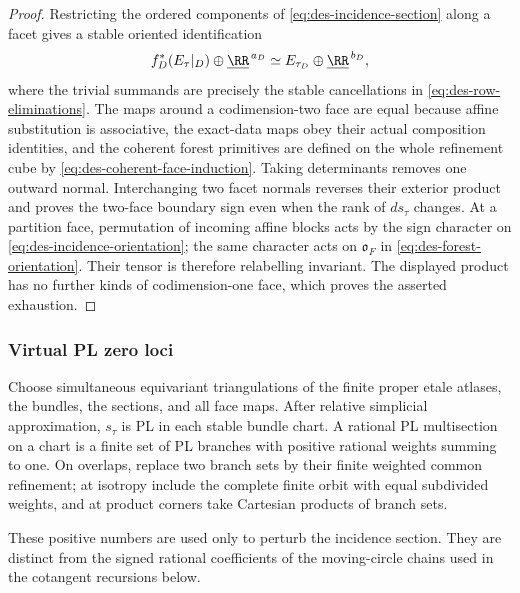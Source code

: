 \begin{proof}
Restricting the ordered components of \eqref{eq:des-incidence-section} along a
facet gives a stable oriented identification
\begin{equation}
 f_D^*(E_\tau|_D)\oplus\underline{\RR}^{\,a_D}
 \simeq E_{\tau_D}\oplus\underline{\RR}^{\,b_D},
 \label{eq:des-stable-face-bundle}
\end{equation}
where the trivial summands are precisely the stable cancellations in
\eqref{eq:des-row-eliminations}.  The maps around a codimension-two face are
equal because affine substitution is associative, the exact-data maps obey
their actual composition identities, and the coherent forest primitives are
defined on the whole refinement cube by
\eqref{eq:des-coherent-face-induction}.  Taking
determinants removes one outward normal.  Interchanging two facet normals
reverses their exterior product and proves the two-face boundary sign even
when the rank of $ds_\tau$ changes.
At a partition face, permutation of incoming affine blocks acts by the sign
character on \eqref{eq:des-incidence-orientation}; the same character acts
on $\mathfrak o_F$ in \eqref{eq:des-forest-orientation}.  Their tensor is
therefore relabelling invariant.
The displayed product has no further kinds of codimension-one face, which
proves the asserted exhaustion.
\end{proof}

\subsubsection{Virtual PL zero loci}

Choose simultaneous equivariant triangulations of the finite proper
etale atlases, the bundles, the sections, and all face maps.  After relative
simplicial approximation, $s_\tau$ is PL in each stable bundle chart.  A
rational PL multisection on a chart is a finite set of PL branches with
positive rational weights summing to one.  On overlaps, replace two branch
sets by their finite weighted common refinement; at isotropy include the
complete finite orbit with equal subdivided weights, and at product corners
take Cartesian products of branch sets.

These positive numbers are used only to perturb the incidence section.
They are distinct from the signed rational coefficients of the moving-circle
chains used in the cotangent recursions below.

